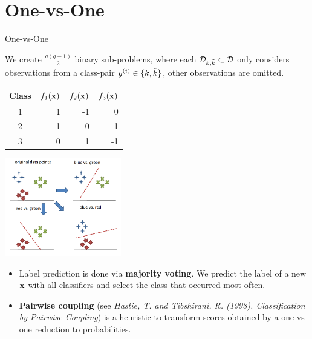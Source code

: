 \documentclass[11pt,compress,t,notes=noshow, xcolor=table]{beamer}
\begin{document}
\section{One-vs-One}

\begin{vbframe}{One-vs-One}

    We create $\frac{g(g - 1)}{2}$ binary sub-problems, where each $\mathcal{D}_{k, \tilde k} \subset \mathcal{D}$ only considers observations from a class-pair $y^{(i)} \in \{k, \tilde k\}$, other observations are omitted.

    \begin{table}[]
    \begin{tabular}{|c|r|r|r|} \hline
    \textbf{Class}  & \textbf{$f_1{(\mathbf{x})}$} & \textbf{$f_2{(\mathbf{x})}$}  & \textbf{$f_3{(\mathbf{x})}$} \\ \hline
    \textbf{$1$}  &   1                 & -1                   & 0                  \\ \hline
    \textbf{$2$}  &  -1                 &  0                   & 1                   \\ \hline
    \textbf{$3$}  & 0                  &  1                   &  -1                   \\ \hline
    \end{tabular}
    \end{table}


    \begin{center}
    \includegraphics[width=0.38\textwidth]{figure_man/one_vs_one.png}
    \end{center}

    \framebreak 

  \begin{itemize}
    \item Label prediction is done via \textbf{majority voting}. We predict the label of a new $\mathbf{x}$ with all classifiers and select the class that occurred most often. 

    \item \textbf{Pairwise coupling} (see \emph{Hastie, T. and Tibshirani, R. (1998). Classification by Pairwise Coupling}) is a heuristic to transform scores obtained by a one-vs-one reduction to probabilities. 

  \end{itemize}
  \end{vbframe}
\end{document}
